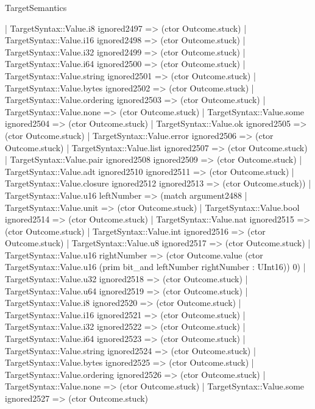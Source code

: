 \begin{lexlean}{TargetSemantics}
\begin{semanticmodule}
{              | TargetSyntax::Value.i8 ignored2497 => (ctor Outcome.stuck)
              | TargetSyntax::Value.i16 ignored2498 => (ctor Outcome.stuck)
              | TargetSyntax::Value.i32 ignored2499 => (ctor Outcome.stuck)
              | TargetSyntax::Value.i64 ignored2500 => (ctor Outcome.stuck)
              | TargetSyntax::Value.string ignored2501 => (ctor Outcome.stuck)
              | TargetSyntax::Value.bytes ignored2502 => (ctor Outcome.stuck)
              | TargetSyntax::Value.ordering ignored2503 => (ctor Outcome.stuck)
              | TargetSyntax::Value.none => (ctor Outcome.stuck)
              | TargetSyntax::Value.some ignored2504 => (ctor Outcome.stuck)
              | TargetSyntax::Value.ok ignored2505 => (ctor Outcome.stuck)
              | TargetSyntax::Value.error ignored2506 => (ctor Outcome.stuck)
              | TargetSyntax::Value.list ignored2507 => (ctor Outcome.stuck)
              | TargetSyntax::Value.pair ignored2508 ignored2509 => (ctor Outcome.stuck)
              | TargetSyntax::Value.adt ignored2510 ignored2511 => (ctor Outcome.stuck)
              | TargetSyntax::Value.closure ignored2512 ignored2513 => (ctor Outcome.stuck))
            | TargetSyntax::Value.u16 leftNumber => (match argument2488
              | TargetSyntax::Value.unit => (ctor Outcome.stuck)
              | TargetSyntax::Value.bool ignored2514 => (ctor Outcome.stuck)
              | TargetSyntax::Value.nat ignored2515 => (ctor Outcome.stuck)
              | TargetSyntax::Value.int ignored2516 => (ctor Outcome.stuck)
              | TargetSyntax::Value.u8 ignored2517 => (ctor Outcome.stuck)
              | TargetSyntax::Value.u16 rightNumber => (ctor Outcome.value (ctor TargetSyntax::Value.u16 (prim bit_and leftNumber rightNumber : UInt16)) 0)
              | TargetSyntax::Value.u32 ignored2518 => (ctor Outcome.stuck)
              | TargetSyntax::Value.u64 ignored2519 => (ctor Outcome.stuck)
              | TargetSyntax::Value.i8 ignored2520 => (ctor Outcome.stuck)
              | TargetSyntax::Value.i16 ignored2521 => (ctor Outcome.stuck)
              | TargetSyntax::Value.i32 ignored2522 => (ctor Outcome.stuck)
              | TargetSyntax::Value.i64 ignored2523 => (ctor Outcome.stuck)
              | TargetSyntax::Value.string ignored2524 => (ctor Outcome.stuck)
              | TargetSyntax::Value.bytes ignored2525 => (ctor Outcome.stuck)
              | TargetSyntax::Value.ordering ignored2526 => (ctor Outcome.stuck)
              | TargetSyntax::Value.none => (ctor Outcome.stuck)
              | TargetSyntax::Value.some ignored2527 => (ctor Outcome.stuck)
}
\end{semanticmodule}
\end{lexlean}
